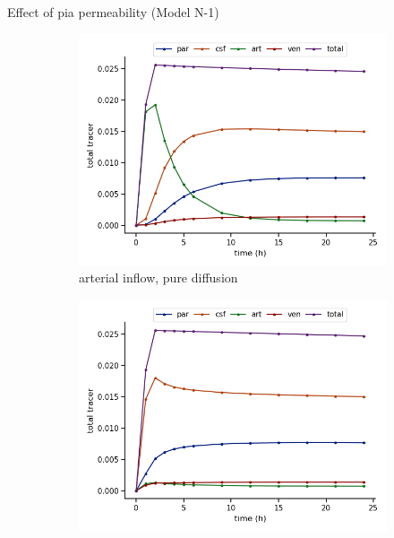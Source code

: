 \documentclass[fleqn,10pt]{wlscirep}
\begin{document}
Effect of pia permeability (Model N-1)    

\begin{figure}
    \caption{}
    \label{fig:4}
\end{figure}

\begin{figure}
     \centering
     \begin{subfigure}[b]{0.33\textwidth}
         \centering
         \includegraphics[width=\textwidth]{modelA_total_conc.png}
         \caption{arterial inflow, pure diffusion}
         \label{fig:y equals x}
     \end{subfigure}
     \hfill
     \begin{subfigure}[b]{0.33\textwidth}
         \centering
         \includegraphics[width=\textwidth]{modelB_total_conc.png}

\end{subfigure}
\end{figure}
\end{document}
